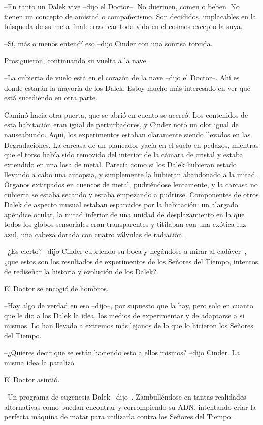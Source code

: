 --En tanto un Dalek vive --dijo el Doctor--. No duermen, comen o beben. No tienen un concepto de amistad o compañerismo. Son decididos, implacables en la búsqueda de su meta final: erradicar toda vida en el cosmos excepto la suya.

--Sí, más o menos entendí eso --dijo Cinder con una sonrisa torcida.

Prosiguieron, continuando su vuelta a la nave.

--La cubierta de vuelo está en el corazón de la nave --dijo el Doctor--. Ahí es donde estarán la mayoría de los Dalek. Estoy mucho más interesado en ver qué está sucediendo en otra parte.

Caminó hacia otra puerta, que se abrió en cuento se acercó. Los contenidos de esta habitación eran igual de perturbadores, y Cinder notó un olor igual de nauseabundo. Aquí, los experimentos estaban claramente siendo llevados en las Degradaciones.
La carcasa de un planeador yacía en el suelo en pedazos, mientras que el torso había sido removido del interior de la cámara de cristal y estaba extendido en una losa de metal. Parecía como si los Dalek hubieran estado llevando a cabo una autopsia, y simplemente la hubieran abandonado a la mitad. Órganos extirpados en cuencos de metal, pudriéndose lentamente, y la carcasa no cubierta se estaba secando y estaba empezando a pudrirse.
Componentes de otros Dalek de aspecto inusual estaban esparcidos por la habitación: un alargado apéndice ocular, la mitad inferior de una unidad de desplazamiento en la que todos los globos sensoriales eran transparentes y titilaban con una exótica luz azul, una cabeza dorada con cuatro válvulas de radiación. 

--¿Es cierto? --dijo Cinder cubriendo su boca y negándose a mirar al cadáver--, ¿que estos son los resultados de experimentos de los Señores del Tiempo, intentos de rediseñar la historia y evolución de los Dalek?.

El Doctor se encogió de hombros. 

--Hay algo de verdad en eso --dijo--, por supuesto que la hay, pero solo en cuanto que le dio a los Dalek la idea, los medios de experimentar y de adaptarse a si mismos. Lo han llevado a extremos más lejanos de lo que lo hicieron  los Señores del Tiempo.

--¿Quieres decir que se están haciendo esto a ellos mismos? --dijo Cinder. La misma idea la paralizó. 

El Doctor asintió. 

--Un programa de eugenesia Dalek --dijo--. Zambulléndose en tantas realidades alternativas como puedan encontrar y corrompiendo su ADN, intentando criar la perfecta máquina de matar para utilizarla contra los Señores del Tiempo.

